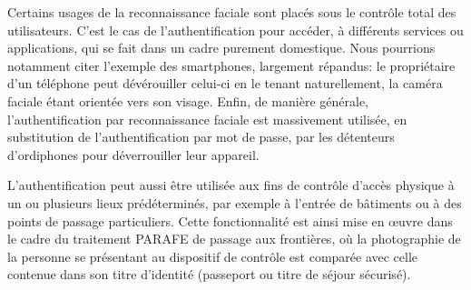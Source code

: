 \documentclass[12pt,french]{article}
\theoremstyle{plain}
\theoremstyle{definition}
\begin{document}
\bigskip

Certains usages de la reconnaissance faciale sont placés sous le contrôle total des utilisateurs.
C'est le cas de l'authentification pour accéder, à différents services ou applications, qui se fait dans un cadre purement domestique.
Nous pourrions notamment citer l'exemple des smartphones, largement répandus: le propriétaire d'un téléphone peut dévérouiller celui-ci en le tenant naturellement, la caméra faciale étant orientée vers son visage.
Enfin, de manière générale, l'authentification par reconnaissance faciale est massivement utilisée, en substitution de l’authentification par mot de passe, par les détenteurs d’ordiphones pour déverrouiller leur appareil.

L’authentification peut aussi être utilisée aux fins de contrôle d’accès physique à un ou plusieurs lieux prédéterminés, par exemple à l’entrée de bâtiments ou à des points de passage particuliers.
Cette fonctionnalité est ainsi mise en œuvre dans le cadre du traitement PARAFE de passage aux frontières,
où la photographie de la personne se présentant au dispositif de contrôle est comparée avec celle contenue dans son titre d’identité (passeport ou titre de séjour sécurisé).


\bigskip
\end{document}
